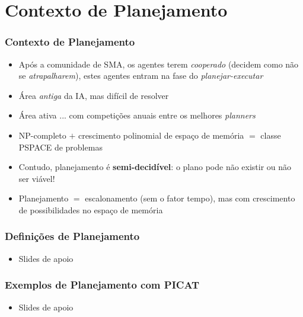 \section{Contexto de Planejamento}
\begin{frame} [allowframebreaks=0.9]


    \frametitle{Contexto de Planejamento}
    \begin{itemize}
    
      \item Após a comunidade de SMA, os agentes terem \textit{cooperado} (decidem como não se    \textit{atrapalharem}), estes agentes entram na fase do \textit{planejar-executar}

      \item Área \textit{antiga} da IA, mas difícil de resolver
     
      \item Área ativa ... com competições anuais entre os melhores \textit{planners}
             
      \item NP-completo $+$ crescimento polinomial de espaço de memória $=$ classe PSPACE de problemas
      
       \item Contudo, planejamento é 
       \textbf{semi-decidível}: o plano pode não existir ou não ser viável!
       
      \item Planejamento $=$ escalonamento (sem o fator tempo), mas com crescimento de possibilidades no espaço de memória
      
    \end{itemize}
\end{frame}
\begin{frame}

    \frametitle{Definições de Planejamento}
    \begin{itemize}
    
      \item Slides de apoio
       
       
    \end{itemize}
\end{frame}

\begin{frame}

    \frametitle{Exemplos de Planejamento com PICAT}

    \begin{itemize}
    
      \item Slides de apoio
       
       
    \end{itemize}
\end{frame}

